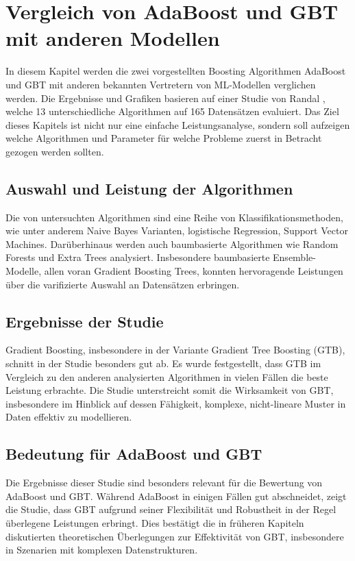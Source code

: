 \section {Vergleich von AdaBoost und GBT mit anderen Modellen}
In diesem Kapitel werden die zwei vorgestellten Boosting Algorithmen AdaBoost und GBT mit anderen bekannten Vertretern von ML-Modellen verglichen werden. Die Ergebnisse und Grafiken basieren auf einer Studie von Randal \textcite{Olson2018}, welche 13 unterschiedliche Algorithmen auf 165 Datensätzen evaluiert. Das Ziel dieses Kapitels ist nicht nur eine einfache Leistungsanalyse, sondern soll aufzeigen welche Algorithmen und Parameter für welche Probleme zuerst in Betracht gezogen werden sollten.

\subsection{Auswahl und Leistung der Algorithmen}
Die von \textcite{Olson2018} untersuchten Algorithmen sind eine Reihe von Klassifikationsmethoden, wie unter anderem Naive Bayes Varianten, logistische Regression, Support Vector Machines. Darüberhinaus werden auch baumbasierte Algorithmen wie Random Forests und Extra Trees analysiert. Insbesondere baumbasierte Ensemble-Modelle, allen voran Gradient Boosting Trees, konnten hervoragende Leistungen über die varifizierte Auswahl an Datensätzen erbringen.

\subsection{Ergebnisse der Studie}
Gradient Boosting, insbesondere in der Variante Gradient Tree Boosting (GTB), schnitt in der Studie besonders gut ab. Es wurde festgestellt, dass GTB im Vergleich zu den anderen analysierten Algorithmen in vielen Fällen die beste Leistung erbrachte. Die Studie unterstreicht somit die Wirksamkeit von GBT, insbesondere im Hinblick auf dessen Fähigkeit, komplexe, nicht-lineare Muster in Daten effektiv zu modellieren.

\subsection{Bedeutung für AdaBoost und GBT}
Die Ergebnisse dieser Studie sind besonders relevant für die Bewertung von AdaBoost und GBT. Während AdaBoost in einigen Fällen gut abschneidet, zeigt die Studie, dass GBT aufgrund seiner Flexibilität und Robustheit in der Regel überlegene Leistungen erbringt. Dies bestätigt die in früheren Kapiteln diskutierten theoretischen Überlegungen zur Effektivität von GBT, insbesondere in Szenarien mit komplexen Datenstrukturen.

